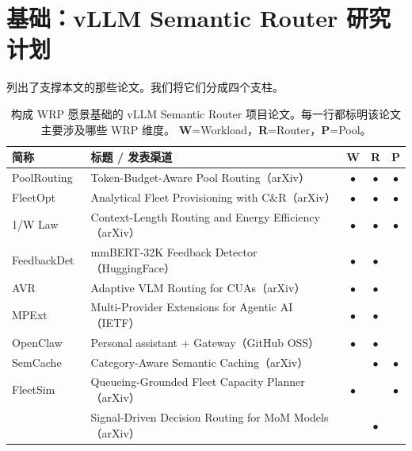\section{基础：vLLM Semantic Router 研究计划}
\label{sec:foundation}

 列出了支撑本文的那些论文。我们将它们分成四个支柱。

\begin{table}[t]
\centering
\caption{构成 WRP 愿景基础的 vLLM Semantic Router 项目论文。每一行都标明该论文主要涉及哪些 WRP 维度。 \textbf{W}=Workload，\textbf{R}=Router，\textbf{P}=Pool。}
\label{tab:ownwork}
\small
\renewcommand{\arraystretch}{1.15}
\begin{tabularx}{\textwidth}{l X c c c}
\toprule
\textbf{简称} & \textbf{标题 / 发表渠道} & \textbf{W} & \textbf{R} & \textbf{P} \\
\midrule
\rowcolor{lightgray}
PoolRouting~\cite{poolrouting2026}
  & Token-Budget-Aware Pool Routing（arXiv） & $\bullet$ & $\bullet$ & $\bullet$ \\
FleetOpt~\cite{fleetopt2026}
  & Analytical Fleet Provisioning with C\&R（arXiv） & $\bullet$ & $\bullet$ & $\bullet$ \\
\rowcolor{lightgray}
1/W Law~\cite{onewlaw2026}
  & Context-Length Routing and Energy Efficiency（arXiv） & $\bullet$ & $\bullet$ & $\bullet$ \\
\midrule
FeedbackDet~\cite{feedbackdet2026}
  & mmBERT-32K Feedback Detector（HuggingFace） & $\bullet$ & $\bullet$ &  \\
\rowcolor{lightgray}
AVR~\cite{avr2026}
  & Adaptive VLM Routing for CUAs（arXiv） & $\bullet$ & $\bullet$ &  \\
MPExt~\cite{mpext2025}
  & Multi-Provider Extensions for Agentic AI（IETF） & $\bullet$ & $\bullet$ &  \\
\rowcolor{lightgray}
OpenClaw~\cite{openclaw2026}
  & Personal assistant + Gateway（GitHub OSS） & $\bullet$ & $\bullet$ &  \\
SemCache~\cite{wang2025cache}
  & Category-Aware Semantic Caching（arXiv） &  & $\bullet$ & $\bullet$ \\
FleetSim~\cite{fleetsim2026}
  & Queueing-Grounded Fleet Capacity Planner（arXiv） & $\bullet$ &  & $\bullet$ \\
\midrule
\rowcolor{lightgray}
\vsr{}~\cite{vllmsr2026}
  & Signal-Driven Decision Routing for MoM Models（arXiv） &  & $\bullet$ &  \\

\end{tabularx}
\end{table}
